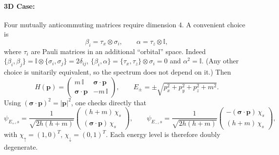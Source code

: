 \documentclass{article}
\begin{document}
    \paragraph{3D Case:}
    Four mutually anticommuting matrices require dimension 4. A convenient choice is
    \begin{equation}
        \beta_i = \tau_x \otimes \sigma_i, \qquad \alpha = \tau_z \otimes \mathbb{I},
    \end{equation}
    where $\tau_i$ are Pauli matrices in an additional ``orbital'' space. Indeed $\{\beta_i,\beta_j\} = \mathbb{I}\otimes\{\sigma_i,\sigma_j\} = 2\delta_{ij}$, $\{\beta_i,\alpha\} = \{\tau_x,\tau_z\}\otimes\sigma_i = 0$ and $\alpha^2 = \mathbb{I}$. (Any other choice is unitarily equivalent, so the spectrum does not depend on it.) Then
    \begin{equation}
        H(\mathbf{p}) = \begin{pmatrix} m\,\mathbb{I} & \boldsymbol{\sigma}\cdot\mathbf{p} \\ \boldsymbol{\sigma}\cdot\mathbf{p} & -m\,\mathbb{I} \end{pmatrix}, \qquad E_\pm = \pm\sqrt{p_x^2 + p_y^2 + p_z^2 + m^2}.
    \end{equation}
    Using $(\boldsymbol{\sigma}\cdot\mathbf{p})^2 = |\mathbf{p}|^2$, one checks directly that
    \begin{equation}
        \psi_{E_+,s} = \frac{1}{\sqrt{2h(h+m)}}\begin{pmatrix} (h+m)\,\chi_s \\ (\boldsymbol{\sigma}\cdot\mathbf{p})\,\chi_s \end{pmatrix}, \qquad
        \psi_{E_-,s} = \frac{1}{\sqrt{2h(h+m)}}\begin{pmatrix} -(\boldsymbol{\sigma}\cdot\mathbf{p})\,\chi_s \\ (h+m)\,\chi_s \end{pmatrix},
    \end{equation}
    with $\chi_\uparrow = (1,0)^T$, $\chi_\downarrow = (0,1)^T$. Each energy level is therefore doubly degenerate.
\end{document}
